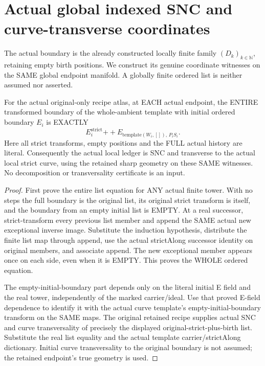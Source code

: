 \section{Actual global indexed SNC and curve-transverse coordinates}

The actual boundary is the already constructed locally finite family
$(D_k)_{k\in\mathbb N}$, retaining empty birth positions. We construct its
genuine coordinate witnesses on the SAME global endpoint manifold. A
globally finite ordered list is neither assumed nor asserted.

\begin{theorem}
\label{hir:sharp-actual-local-full-boundary-ordered-decomposition}
\leanok
For the actual original-only recipe atlas, at EACH actual endpoint, the
ENTIRE transformed boundary of the whole-ambient template with initial
ordered boundary $E_i$ is EXACTLY
\[
 E_i^{\mathrm{strict}}\mathbin{+\!+}
 E_{\mathrm{template}(W_i,[]),\,P_iS_i}.
\]
Here all strict transforms, empty positions and the FULL actual history
are literal. Consequently the actual local ledger is SNC and transverse
to the actual local strict curve, using the retained sharp geometry on
these SAME witnesses. No decomposition or transversality certificate is
an input.
\end{theorem}
\begin{proof}
First prove the entire list equation for ANY actual finite tower. With
no steps the full boundary is the original list, its original strict
transform is itself, and the boundary from an empty initial list is EMPTY.
At a real successor, strict-transform every previous list member and
append the SAME actual new exceptional inverse image. Substitute the
induction hypothesis, distribute the finite list map through append,
use the actual strictAlong successor identity on original members, and
associate append. The new exceptional member appears once on each side,
even when it is EMPTY. This proves the WHOLE ordered equation.

The empty-initial-boundary part depends only on the literal initial E
field and the real tower, independently of the marked carrier/ideal.
Use that proved E-field dependence to identify it with the actual curve
template's empty-initial-boundary transform on the SAME maps. The
original retained recipe supplies actual SNC and curve transversality
of precisely the displayed original-strict-plus-birth list. Substitute
the real list equality and the actual template carrier/strictAlong
dictionary. Initial curve transversality to the original boundary is
not assumed; the retained endpoint's true geometry is used.
\end{proof}

